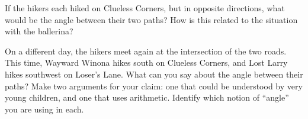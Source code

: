 \documentclass[nooutcomes]{ximera}
\begin{document}
\newpage

\begin{problem} \label{GetLost6}
If the hikers each hiked on Clueless Corners, but in opposite directions, what would be the angle between their two paths?  How is this related to the situation with the ballerina?


\end{problem}


\begin{problem} \label{GetLost7}
On a different day, the hikers meet again at the intersection of the two roads.  This time, Wayward Winona hikes south on Clueless Corners, and Lost Larry hikes southwest on Loser's Lane.  What can you say about the angle between their paths?  Make two arguments for your claim: one that could be understood by very young children, and one that uses arithmetic.  Identify which notion of ``angle'' you are using in each.


\begin{center}
\end{center}
\end{problem}


\newpage
\end{document}
